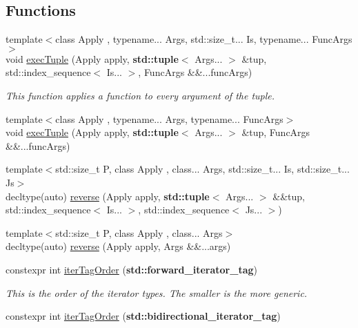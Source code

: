 \subsection*{Functions}
\begin{DoxyCompactItemize}
\item 
{\footnotesize template$<$class Apply , typename... Args, std\+::size\+\_\+t... Is, typename... Func\+Args$>$ }\\void \hyperlink{namespaceit_1_1help_a5820d5d8b10a14b119b1a4402b0d0576}{exec\+Tuple} (Apply apply, {\bf std\+::tuple}$<$ Args... $>$ \&tup, std\+::index\+\_\+sequence$<$ Is... $>$, Func\+Args \&\&...func\+Args)
\begin{DoxyCompactList}\small\item\em This function applies a function to every argument of the tuple. \end{DoxyCompactList}\item 
{\footnotesize template$<$class Apply , typename... Args, typename... Func\+Args$>$ }\\void \hyperlink{namespaceit_1_1help_a934f50a02efe9f4128920fec125e7e9f}{exec\+Tuple} (Apply apply, {\bf std\+::tuple}$<$ Args... $>$ \&tup, Func\+Args \&\&...func\+Args)
\item 
{\footnotesize template$<$std\+::size\+\_\+t P, class Apply , class... Args, std\+::size\+\_\+t... Is, std\+::size\+\_\+t... Js$>$ }\\decltype(auto) \hyperlink{namespaceit_1_1help_a99e8e2c8ea28d4c67e335d64a67434fd}{reverse} (Apply apply, {\bf std\+::tuple}$<$ Args... $>$ \&\&tup, std\+::index\+\_\+sequence$<$ Is... $>$, std\+::index\+\_\+sequence$<$ Js... $>$)
\item 
{\footnotesize template$<$std\+::size\+\_\+t P, class Apply , class... Args$>$ }\\decltype(auto) \hyperlink{namespaceit_1_1help_aa4830ca624b45e8ebdfff900e3470946}{reverse} (Apply apply, Args \&\&...args)
\item 
constexpr int \hyperlink{namespaceit_1_1help_ad5efd6f9a3703da509d0853b95b515db}{iter\+Tag\+Order} ({\bf std\+::forward\+\_\+iterator\+\_\+tag})
\begin{DoxyCompactList}\small\item\em This is the order of the iterator types. The smaller is the more generic. \end{DoxyCompactList}\item 
constexpr int \hyperlink{namespaceit_1_1help_afa9d72e80bd7c53bb9026f0b5c1fd246}{iter\+Tag\+Order} ({\bf std\+::bidirectional\+\_\+iterator\+\_\+tag})

\end{DoxyCompactItemize}

